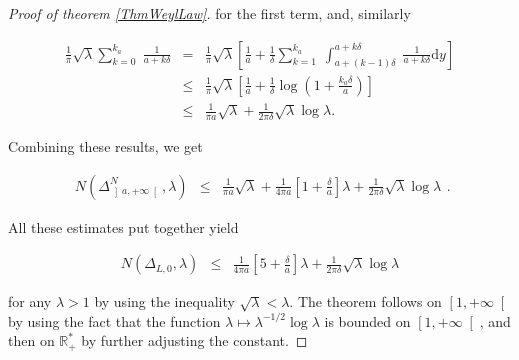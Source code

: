 \documentclass{jams-l}
\theoremstyle{definition}
\theoremstyle{remark}
\numberwithin{equation}{section}
\begin{document}
\begin{proof}[Proof of theorem \ref{ThmWeylLaw}]
            \noindent for the first term, and, similarly
            
            \[ \begin{array}{lll}
                    \frac{1}{\pi} \sqrt{\lambda} \sum\limits_{k=0}^{k_a} \; \frac{1}{a + k \delta} & = & \frac{1}{\pi} \sqrt{\lambda} \left[ \frac{1}{a} + \frac{1}{\delta} \sum\limits_{k=1}^{k_a} \; \int_{a + \left( k-1 \right) \delta}^{a + k \delta} \; \frac{1}{a + k \delta} \mathrm{d}y \right] \\[1em]
                    
                    & \leqslant & \frac{1}{\pi} \sqrt{\lambda} \left[ \frac{1}{a} + \frac{1}{\delta} \log \left( 1 + \frac{k_a \delta}{a} \right) \right] \\[1em]
                    
                    & \leqslant & \frac{1}{\pi a} \sqrt{\lambda} + \frac{1}{2 \pi \delta} \sqrt{\lambda} \log \lambda.
                \end{array} \]
            
            \noindent Combining these results, we get
            
            \begin{equation}
            \label{IneqWeylLaw}
                \begin{array}{lll}
                    N \left( \Delta^N_{\left] a, + \infty \right[}, \lambda \right) & \leqslant & \frac{1}{\pi a} \sqrt{\lambda} + \frac{1}{4 \pi a} \left[ 1 + \frac{\delta}{a} \right] \lambda + \frac{1}{2 \pi \delta} \sqrt{\lambda} \log \lambda
                \end{array} .
            \end{equation}
            
            \noindent All these estimates put together yield
            
            \[ \begin{array}{lll}
                    N \left( \Delta_{L,0}, \lambda \right) & \leqslant & \frac{1}{4 \pi a} \left[ 5 + \frac{\delta}{a} \right] \lambda + \frac{1}{2 \pi \delta} \sqrt{\lambda} \log \lambda
                \end{array} \]
            
            \noindent for any $\lambda > 1$ by using the inequality $\sqrt{\lambda} < \lambda$. The theorem follows on $\left[ 1, + \infty \right[$ by using the fact that the function $\lambda \mapsto \lambda^{-1/2} \log \lambda$ is bounded on $\left[ 1, + \infty \right[$, and then on $\mathbb{R}_+^{\ast}$ by further adjusting the constant.
            
        \end{proof}
        
\end{document}
